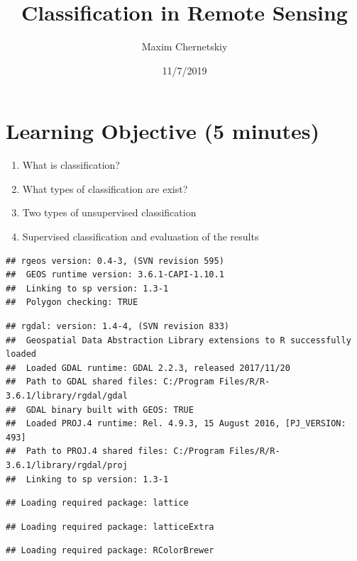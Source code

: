 \documentclass[]{article}
\title{Classification in Remote Sensing}
\author{Maxim Chernetskiy}
\date{11/7/2019}
\providecommand{\tightlist}{%
  \setlength{\itemsep}{0pt}\setlength{\parskip}{0pt}}
\begin{document}
\maketitle

\hypertarget{learning-objective-5-minutes}{%
\section{Learning Objective (5
minutes)}\label{learning-objective-5-minutes}}

\begin{enumerate}
\def\labelenumi{\arabic{enumi}.}
\tightlist
\item
  What is classification?
\item
  What types of classification are exist?
\item
  Two types of unsupervised classification
\item
  Supervised classification and evaluastion of the results
\end{enumerate}

\begin{verbatim}
## rgeos version: 0.4-3, (SVN revision 595)
##  GEOS runtime version: 3.6.1-CAPI-1.10.1 
##  Linking to sp version: 1.3-1 
##  Polygon checking: TRUE
\end{verbatim}

\begin{verbatim}
## rgdal: version: 1.4-4, (SVN revision 833)
##  Geospatial Data Abstraction Library extensions to R successfully loaded
##  Loaded GDAL runtime: GDAL 2.2.3, released 2017/11/20
##  Path to GDAL shared files: C:/Program Files/R/R-3.6.1/library/rgdal/gdal
##  GDAL binary built with GEOS: TRUE 
##  Loaded PROJ.4 runtime: Rel. 4.9.3, 15 August 2016, [PJ_VERSION: 493]
##  Path to PROJ.4 shared files: C:/Program Files/R/R-3.6.1/library/rgdal/proj
##  Linking to sp version: 1.3-1
\end{verbatim}

\begin{verbatim}
## Loading required package: lattice
\end{verbatim}

\begin{verbatim}
## Loading required package: latticeExtra
\end{verbatim}

\begin{verbatim}
## Loading required package: RColorBrewer
\end{verbatim}
\end{document}
